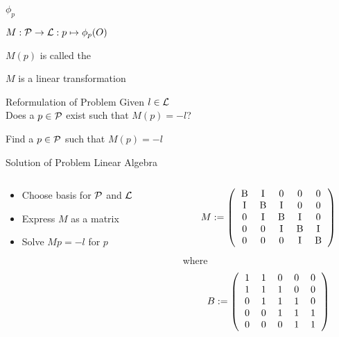 \begin{frame}{$\phi_{p}$}
	\begin{definition}
		$M : \mathcal{P} \rightarrow \mathcal{L} : p \mapsto \phi_{p}(O)$
	\end{definition}
	
	$M(p)$ is called the 
	
	\pause
	\bigskip	
	\begin{theorem}
		$M$ is a linear transformation
	\end{theorem}
\end{frame}

\begin{frame}{Reformulation of Problem}
	Given $l \in \mathcal{L}$\\
	Does a $p \in \mathcal{P}$ exist such that $M(p) = -l$?
	
	\pause
	\bigskip
	Find a $p \in \mathcal{P}$ such that $M(p) = -l$	
\end{frame}

\begin{frame}{Solution of Problem}
	Linear Algebra
	\begin{columns}[t]
		\begin{column}{0.45\textwidth}
			\begin{itemize}
				\item Choose basis for $\mathcal{P}$ and $\mathcal{L}$
				\item Express $M$ as a matrix
				\item Solve $M p = -l$ for $p$
			\end{itemize}

		\end{column}
		\begin{column}{0.45\textwidth}
			\[
				M := \left(
				\begin{tabular}{ccccc}
					B & I & 0 & 0 & 0 \\
					I & B & I & 0 & 0 \\
					0 & I & B & I & 0 \\
					0 & 0 & I & B & I \\
					0 & 0 & 0 & I & B \\
				\end{tabular}
				\right)
			\]
			where
			\[
				B := \left(
				\begin{tabular}{ccccc}
					1 & 1 & 0 & 0 & 0 \\
					1 & 1 & 1 & 0 & 0 \\
					0 & 1 & 1 & 1 & 0 \\
					0 & 0 & 1 & 1 & 1 \\
					0 & 0 & 0 & 1 & 1 \\
				\end{tabular}
				\right)
			\]
		\end{column}
	\end{columns}
\end{frame}


